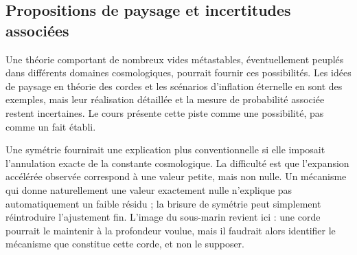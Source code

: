 \subsection{Propositions de paysage et incertitudes associées}

Une théorie comportant de nombreux vides métastables, éventuellement peuplés dans différents domaines cosmologiques, pourrait fournir ces possibilités. Les idées de paysage en théorie des cordes et les scénarios d’inflation éternelle en sont des exemples, mais leur réalisation détaillée et la mesure de probabilité associée restent incertaines. Le cours présente cette piste comme une possibilité, pas comme un fait établi.

Une symétrie fournirait une explication plus conventionnelle si elle imposait l’annulation exacte de la constante cosmologique. La difficulté est que l’expansion accélérée observée correspond à une valeur petite, mais non nulle. Un mécanisme qui donne naturellement une valeur exactement nulle n’explique pas automatiquement un faible résidu ; la brisure de symétrie peut simplement réintroduire l’ajustement fin. L’image du sous-marin revient ici : une corde pourrait le maintenir à la profondeur voulue, mais il faudrait alors identifier le mécanisme que constitue cette corde, et non le supposer.

\begin{classroomqa}
\end{classroomqa}

\begin{classroomqa}
\end{classroomqa}


